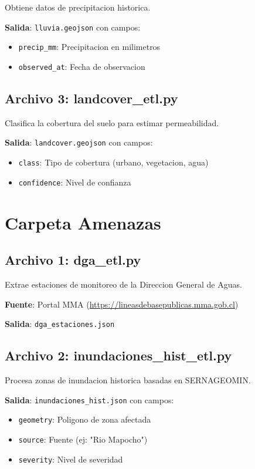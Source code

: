 \documentclass[12pt,a4paper]{article}
\begin{document}
Obtiene datos de precipitacion historica.

\textbf{Salida}: \texttt{lluvia.geojson} con campos:
\begin{itemize}
    \item \texttt{precip\_mm}: Precipitacion en milimetros
    \item \texttt{observed\_at}: Fecha de observacion
\end{itemize}

\subsection{Archivo 3: landcover\_etl.py}

Clasifica la cobertura del suelo para estimar permeabilidad.

\textbf{Salida}: \texttt{landcover.geojson} con campos:
\begin{itemize}
    \item \texttt{class}: Tipo de cobertura (urbano, vegetacion, agua)
    \item \texttt{confidence}: Nivel de confianza
\end{itemize}

\section{Carpeta Amenazas}

\subsection{Archivo 1: dga\_etl.py}

Extrae estaciones de monitoreo de la Direccion General de Aguas.

\textbf{Fuente}: Portal MMA (\url{https://lineasdebasepublicas.mma.gob.cl})

\textbf{Salida}: \texttt{dga\_estaciones.json}

\subsection{Archivo 2: inundaciones\_hist\_etl.py}

Procesa zonas de inundacion historica basadas en SERNAGEOMIN.

\textbf{Salida}: \texttt{inundaciones\_hist.json} con campos:
\begin{itemize}
    \item \texttt{geometry}: Poligono de zona afectada
    \item \texttt{source}: Fuente (ej: "Rio Mapocho")
    \item \texttt{severity}: Nivel de severidad
\end{itemize}
\end{document}
